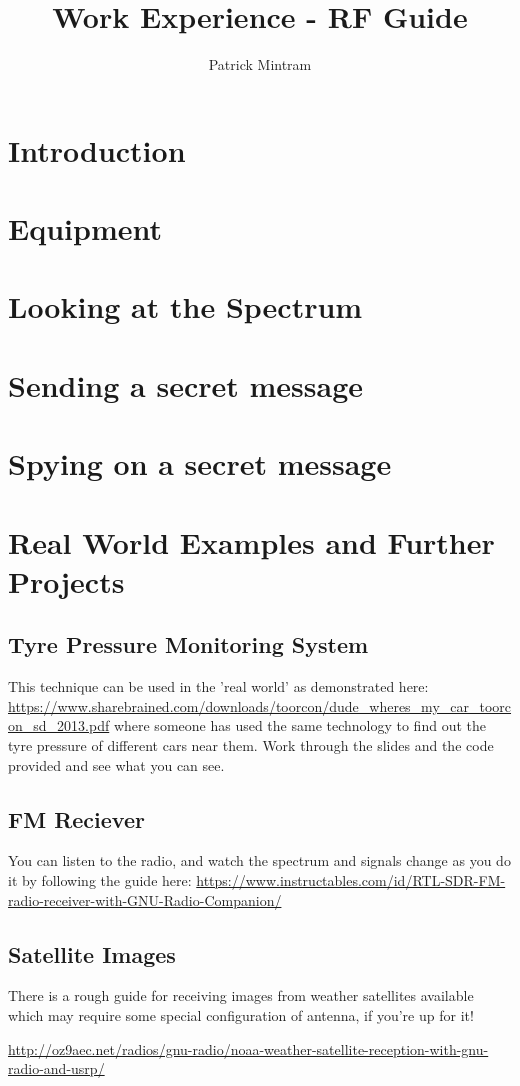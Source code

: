 \documentclass[titlepage,a4paper]{article}
\begin{document}
\title{Work Experience - RF Guide}
\author{Patrick Mintram}
\maketitle

\tableofcontents
\listoffigures
\printglossaries
\newpage

\section{Introduction}

\newpage

\section{Equipment}

\newpage

\section{Looking at the Spectrum}

\newpage

\section{Sending a secret message}

\newpage

\section{Spying on a secret message}

\newpage

\section{Real World Examples and Further Projects}
\subsection{Tyre Pressure Monitoring System}
This technique can be used in the 'real world' as demonstrated here: \url{https://www.sharebrained.com/downloads/toorcon/dude\_wheres\_my\_car\_toorcon\_sd\_2013.pdf} where someone has used the same technology to find out the tyre pressure of different cars near them. Work through the slides and the code provided and see what you can see.

\subsection{FM Reciever}
You can listen to the radio, and watch the spectrum and signals change as you do it by following the guide here: \url{https://www.instructables.com/id/RTL-SDR-FM-radio-receiver-with-GNU-Radio-Companion/}

\subsection{Satellite Images}
There is a rough guide for receiving images from weather satellites available which may require some special configuration of antenna, if you're up for it! 

\url{http://oz9aec.net/radios/gnu-radio/noaa-weather-satellite-reception-with-gnu-radio-and-usrp/}

\newpage
\end{document}
